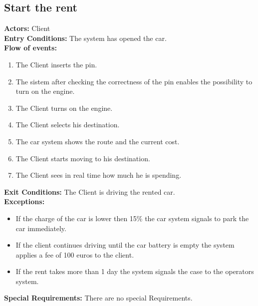 \subsection{Start the rent}
%
\textbf{Actors:}
Client \\
%
\textbf{Entry Conditions:}
The system has opened the car.\\
%
\textbf{Flow of events:}
\begin{enumerate}
\item The Client inserts the pin.
\item The sistem after checking the correctness of the pin enables the possibility to turn on the engine.
\item The Client turns on the engine.
\item The Client selects his destination.
\item The car system shows the route and the current cost.
\item The Client starts moving to his destination.
\item The Client sees in real time how much he is spending.
\end{enumerate}
\textbf{Exit Conditions:}
The Client is driving the rented car.\\
%
\textbf{Exceptions:}
\begin{itemize}
\item If the charge of the car is lower then 15\% the car system signals to park the car immediately.
\item If the client continues driving until the car battery is empty the system applies a fee of 100 euros to the client.
\item If the rent takes more than 1 day the system signals the case to the operators system.
\end{itemize}
%
\textbf{Special Requirements:}
There are no special Requirements.



